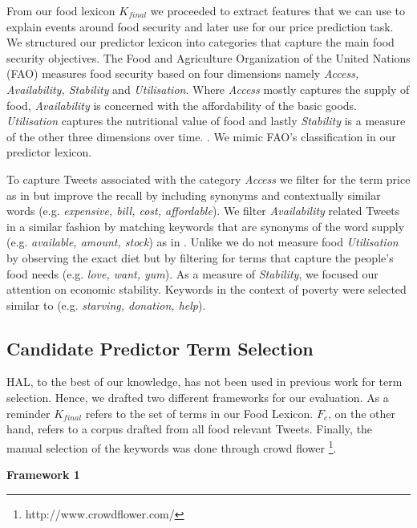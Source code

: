From our food lexicon $K_{final}$ we proceeded to extract features that we can use to explain events around food security and later use for our price prediction task. We structured our predictor lexicon into categories that capture the main food security objectives. The Food and Agriculture Organization of the United Nations (FAO) measures food security based on four dimensions namely \emph{Access, Availability, Stability} and \emph{Utilisation}. Where \emph{Access} mostly captures the supply of food, \emph{Availability} is concerned with the affordability of the basic goods. \emph{Utilisation} captures the nutritional value of food and lastly \emph{Stability} is a measure of the other three dimensions over time.  \cite{fao2008}. We mimic FAO's classification in our predictor lexicon. 

To capture Tweets associated with the category \emph{Access} we filter for the term price as in \cite{ungp2013} but improve the recall by including synonyms and contextually similar words (e.g. \emph{expensive, bill, cost, affordable}). We filter \emph{Availability} related Tweets in a similar fashion by matching keywords that are synonyms of the word supply (e.g. \emph{available, amount, stock}) as in \cite{hum14}. Unlike \cite{AbbarMW14} we do not measure food \emph{Utilisation} by observing the exact diet but by filtering for terms that capture the people's food needs (e.g. \emph{love, want, yum}). As a measure of \emph{Stability}, we focused our attention on economic stability. Keywords in the context of poverty were selected similar to \cite{RePEc} \cite{hum14} (e.g. \emph{starving, donation, help}).



\subsection{Candidate Predictor Term Selection}

HAL, to the best of our knowledge, has not been used in previous work for term selection. Hence, we drafted two different frameworks for our evaluation. As a reminder $K_{final}$ refers to the set of terms in our Food Lexicon. $F_c$, on the other hand, refers to a corpus drafted from all food relevant Tweets. Finally, the manual selection of the keywords was done through crowd flower \footnote{http://www.crowdflower.com/}. 


\textbf{Framework 1}

